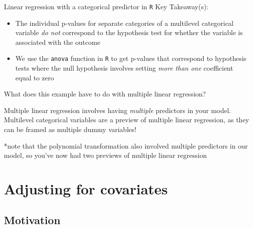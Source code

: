 \documentclass[10pt,t]{beamer}
\begin{document}
\begin{frame}{Linear regression with a categorical predictor in \texttt{R}}
Key Takeaway(s):
\vspace{0.3cm}

\begin{itemize}
	\item The individual p-values for separate categories of a multilevel categorical variable \textit{do not} correspond to the hypothesis test for whether the variable is associated with the outcome
	
	\medskip
	
	\item We use the \texttt{anova} function in \texttt{R} to get p-values that correspond to hypothesis tests where the null hypothesis involves setting \textit{more than one} coefficient equal to zero
\end{itemize} \pause

\vspace{0.3cm}

What does this example have to do with multiple linear regression? 

\vspace{0.3cm}

Multiple linear regression involves having \textit{multiple} predictors in your model. Multilevel categorical variables are a preview of multiple linear regression, as they can be framed as multiple dummy variables! \pause

\vspace{0.2cm}

*note that the polynomial transformation also involved multiple predictors in our model, so you've now had two previews of multiple linear regression

\end{frame}

\section{Adjusting for covariates}

\subsection{Motivation}
\end{document}

